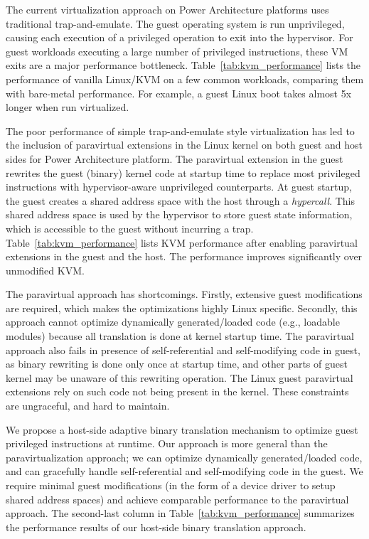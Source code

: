 \documentclass[10pt,twocolumn]{article}
\begin{document}
The current virtualization approach on Power Architecture platforms uses traditional
trap-and-emulate. The guest operating system is run unprivileged, causing each
execution of a privileged
operation to exit into the hypervisor. For guest workloads executing a large number
of privileged instructions, these VM exits are a major performance
bottleneck. Table~\ref{tab:kvm_performance} lists the performance of vanilla Linux/KVM
on a few common workloads, comparing them with bare-metal performance.
For example, a guest Linux boot takes almost 5x longer when run virtualized.

The poor performance of simple trap-and-emulate style virtualization has led to
the inclusion of paravirtual extensions in the Linux kernel on both
guest and host sides for Power Architecture platform\cite{pvpower}. The paravirtual extension in the guest
rewrites the guest (binary) kernel
code at startup time to replace most privileged instructions with
hypervisor-aware unprivileged counterparts.
At guest startup, the guest creates a shared address space with
the host through a {\em hypercall}. This shared address space
is used by the hypervisor to store guest state information, which
is accessible to the guest without incurring a trap.
Table~\ref{tab:kvm_performance} lists KVM performance after enabling paravirtual
extensions in the guest and the host. The performance improves significantly over
unmodified KVM.

The paravirtual approach has shortcomings. Firstly, extensive guest
modifications are required, which makes the optimizations highly Linux specific.
Secondly, this approach
cannot optimize dynamically generated/loaded code (e.g., loadable modules) because
all translation is done at kernel startup time.
The paravirtual approach also
fails in presence of self-referential and
self-modifying code in guest, as binary rewriting is done only
once at startup time, and other parts of guest kernel may be unaware
of this rewriting operation.
The Linux guest paravirtual extensions rely on such code not being present in the
kernel. These constraints are ungraceful, and hard to maintain.

We propose a host-side adaptive binary translation mechanism to optimize guest
privileged instructions at runtime. Our approach is more general than
the paravirtualization approach; we can optimize dynamically
generated/loaded code, and can gracefully handle
self-referential and self-modifying
code in the guest. We require minimal guest
modifications (in the form of a device driver to setup shared address spaces)
and achieve
comparable performance to the paravirtual approach.
The second-last column in Table~\ref{tab:kvm_performance} summarizes the performance results of
our host-side binary translation approach.
\end{document}
